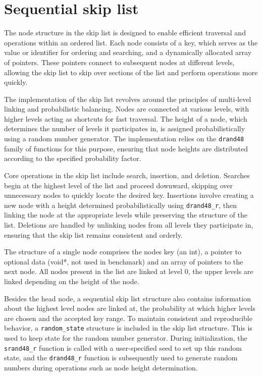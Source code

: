 \documentclass{article}
\begin{document}
\section{Sequential skip list}


The node structure in the skip list is designed to enable efficient traversal and operations within an ordered list. Each node consists of a key, which serves as the value or identifier for ordering and searching, and a dynamically allocated array of pointers. These pointers connect to subsequent nodes at different levels, allowing the skip list to skip over sections of the list and perform operations more quickly.

The implementation of the skip list revolves around the principles of multi-level linking and probabilistic balancing. Nodes are connected at various levels, with higher levels acting as shortcuts for fast traversal. The height of a node, which determines the number of levels it participates in, is assigned probabilistically using a random number generator. The implementation relies on the \texttt{drand48} family of functions for this purpose, ensuring that node heights are distributed according to the specified probability factor. 

Core operations in the skip list include search, insertion, and deletion. Searches begin at the highest level of the list and proceed downward, skipping over unnecessary nodes to quickly locate the desired key. Insertions involve creating a new node with a height determined probabilistically using \texttt{drand48\_r}, then linking the node at the appropriate levels while preserving the structure of the list. Deletions are handled by unlinking nodes from all levels they participate in, ensuring that the skip list remains consistent and orderly.

\vspace{5mm}
The structure of a single node comprises the nodes key (an int), a pointer to optional data (void*, not used in benchmark) and an array of pointers to the next node. All nodes present in the list are linked at level 0, the upper levels are linked depending on the height of the node.

Besides the head node, a sequential skip list structure also contains information about the highest level nodes are linked at, the probability at which higher levels are chosen and the accepted key range.
To maintain consistent and reproducible behavior, a \texttt{random\_state} structure is included in the skip list structure. This is used to keep state for the random number generator. During initialization, the \texttt{srand48\_r} function is called with a user-specified seed to set up this random state, and the \texttt{drand48\_r} function is subsequently used to generate random numbers during operations such as node height determination.
\end{document}
